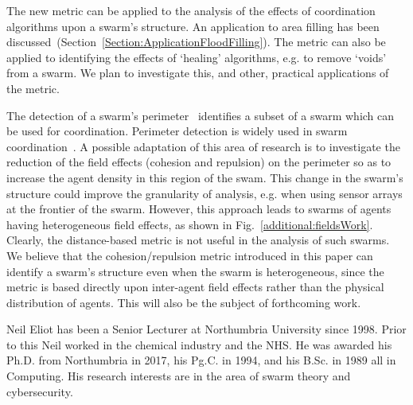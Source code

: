 \documentclass{ieeeaccess}
\begin{document}
The new metric can be applied to the analysis of the effects of coordination
algorithms upon a swarm's structure. An application to area filling has been
discussed~(Section~\ref{Section:ApplicationFloodFilling}). The metric can also
be applied to identifying the effects of `healing' algorithms, e.g. to remove
`voids' from a swarm. We plan to investigate this, and other, practical
applications of the metric.

The detection of a swarm's perimeter~\cite{MD:09, MJ:08, ZAPS:07, JG:13}
identifies a subset of a swarm which can be used for coordination.  Perimeter
detection is widely used in swarm coordination~\cite{ZFG:13, AKK:08,
APZDAMC:09, AZDPS:11}. A possible adaptation of this area of research is to
investigate the reduction of the field effects (cohesion and repulsion) on the
perimeter so as to increase the agent density in this region of the swam. This
change in the swarm's structure could improve the granularity of analysis, e.g.
when using sensor arrays at the frontier of the swarm.  However, this approach
leads to swarms of agents having heterogeneous field effects, as shown in
Fig.~\ref{additional:fieldsWork}. Clearly, the distance-based metric is not
useful in the analysis of such swarms. We believe that the cohesion/repulsion
metric introduced in this paper can identify a swarm's structure even when the
swarm is heterogeneous, since the metric is based directly upon inter-agent
field effects rather than the physical distribution of agents. This will also
be the subject of forthcoming work.

\clearpage




\begin{IEEEbiography}{Neil Eliot} has been a Senior Lecturer at Northumbria University since 1998. Prior to this Neil worked in the chemical industry and the NHS. He was awarded his Ph.D. from Northumbria in 2017, his Pg.C. in 1994, and his B.Sc. in 1989 all in Computing. His research interests are in the area of swarm theory and cybersecurity. 
\end{IEEEbiography}
\end{document}
